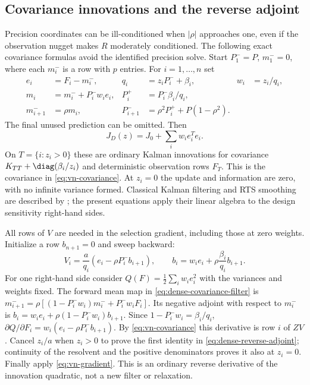 \subsection{Covariance innovations and the reverse adjoint}
Precision coordinates can be ill-conditioned when $|\rho|$ approaches one,
even if the observation nugget makes $R$ moderately conditioned. The
following exact covariance formulas avoid the identified precision solve.
Start $P_1^-=P$, $m_1^-=0$, where each $m_i^-$ is a row with $p$ entries.
For $i=1,\ldots,n$ set
\begin{align}
 e_i&=F_i-m_i^-,& q_i&=z_iP_i^-+\beta_i,& w_i&=z_i/q_i,\nonumber\\
 m_i&=m_i^-+P_i^-w_i e_i,&
 P_i^+&=P_i^-\beta_i/q_i,\nonumber\\
 m_{i+1}^-&=\rho m_i,&
 P_{i+1}^-&=\rho^2P_i^++P(1-\rho^2).
 \label{eq:dense-covariance-filter}
\end{align}
The final unused prediction can be omitted. Then
\begin{equation}\label{eq:dense-innovation-info}
 J_D(z)=J_0+\sum_i w_i e_i^Te_i.
\end{equation}
On $T=\{i:z_i>0\}$ these are ordinary Kalman innovations for covariance
$K_{TT}+\diag(\beta_i/z_i)$ and deterministic observation rows $F_T$.
This is the covariance in \eqref{eq:vn-covariance}. At $z_i=0$ the update
and information are zero, with no infinite variance formed. Classical Kalman
filtering and RTS smoothing are described by
\citet[Theorems 6.6 and 12.2]{Sarkka2023}; the present equations apply their
linear algebra to the design sensitivity right-hand sides.

All rows of $V$ are needed in the selection gradient, including those at zero
weights. Initialize a row $b_{n+1}=0$ and sweep backward:
\begin{equation}\label{eq:dense-reverse-adjoint}
 V_i=\frac{a}{q_i}(e_i-\rho P_i^-b_{i+1}),\qquad
 b_i=w_ie_i+\rho\frac{\beta_i}{q_i}b_{i+1}.
\end{equation}
For one right-hand side consider
$Q(F)=\frac12\sum_i w_ie_i^2$ with the variances and weights fixed.
The forward mean map in \eqref{eq:dense-covariance-filter} is
$m_{i+1}^-=\rho[(1-P_i^-w_i)m_i^-+P_i^-w_iF_i]$.
Its negative adjoint with respect to $m_i^-$ is
$b_i=w_ie_i+\rho(1-P_i^-w_i)b_{i+1}$.
Since $1-P_i^-w_i=\beta_i/q_i$,
$\partial Q/\partial F_i=w_i(e_i-\rho P_i^-b_{i+1})$.
By \eqref{eq:vn-covariance} this derivative is row $i$ of $ZV$.
Cancel $z_i/a$ when $z_i>0$ to prove the first identity in
\eqref{eq:dense-reverse-adjoint}; continuity of the resolvent and the
positive denominators proves it also at $z_i=0$. Finally apply
\eqref{eq:vn-gradient}. This is an ordinary reverse derivative of the
innovation quadratic, not a new filter or relaxation.

